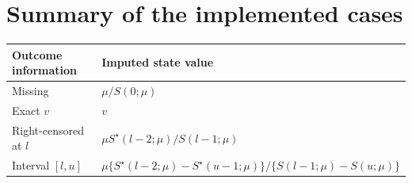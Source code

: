 \documentclass[11pt,a4paper]{article}
\begin{document}
\section{Summary of the implemented cases}

\begin{center}
\begin{tabular}{@{}ll@{}}
\toprule
Outcome information & Imputed state value\\
\midrule
Missing
  & $\mu/S(0;\mu)$\\
Exact $v$
  & $v$\\
Right-censored at $l$
  & $\mu S^\star(l-2;\mu)/S(l-1;\mu)$\\
Interval $[l,u]$
  & $\mu\{S^\star(l-2;\mu)-S^\star(u-1;\mu)\}/
     \{S(l-1;\mu)-S(u;\mu)\}$\\
\bottomrule
\end{tabular}
\end{center}
\end{document}
